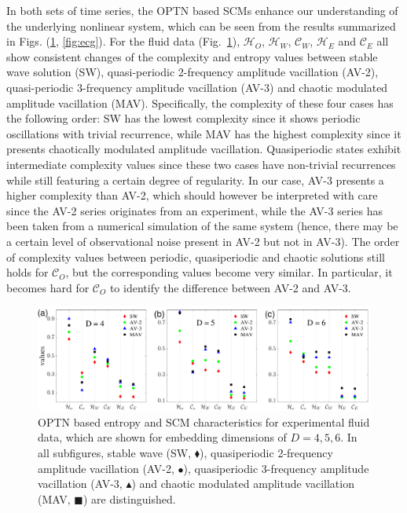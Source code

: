 \documentclass[aip,cha,reprint,nofootinbib]{revtex4-1}
\begin{document}
In both sets of time series, the OPTN based SCMs enhance our understanding of the underlying nonlinear system, which can be seen from the results summarized in Figs. (\ref{fig:fluid}, \ref{fig:ecg}). For the fluid data (Fig.~\ref{fig:fluid}), $\mathcal{H}_O$, $\mathcal{H}_W$, $\mathcal{C}_W$, $\mathcal{H}_E$ and $\mathcal{C}_E$ all show consistent changes of the complexity and entropy values between stable wave solution (SW), quasi-periodic 2-frequency amplitude vacillation (AV-2), quasi-periodic 3-frequency amplitude vacillation (AV-3) and chaotic modulated amplitude vacillation (MAV). Specifically, the complexity of these four cases has the following order: SW has the lowest complexity since it shows periodic oscillations with trivial recurrence, while MAV has the highest complexity since it presents chaotically modulated amplitude vacillation. Quasiperiodic states exhibit intermediate complexity values since these two cases have non-trivial recurrences while still featuring a certain degree of regularity. In our case, AV-3 presents a higher complexity than AV-2, which should however be interpreted with care since the AV-2 series originates from an experiment, while the AV-3 series has been taken from a numerical simulation of the same system (hence, there may be a certain level of observational noise present in AV-2 but not in AV-3). The order of complexity values between periodic, quasiperiodic and chaotic solutions still holds for $\mathcal{C}_O$, but the corresponding values become very similar. In particular, it becomes hard for $\mathcal{C}_O$ to identify the difference between AV-2 and AV-3. 
\begin{figure}
	\centering 
	\includegraphics[width=2\columnwidth]{fluidExample.pdf}
\caption{\small{OPTN based entropy and SCM characteristics for experimental fluid data, which are shown for embedding dimensions of $D = 4, 5, 6$. In all subfigures, stable wave (SW, $\blacklozenge$), quasiperiodic 2-frequency amplitude vacillation (AV-2, $\bullet$), quasiperiodic 3-frequency amplitude vacillation (AV-3, $\blacktriangle$) and chaotic modulated amplitude vacillation (MAV, $\blacksquare$) are distinguished. } \label{fig:fluid}}
\end{figure}
\end{document}
